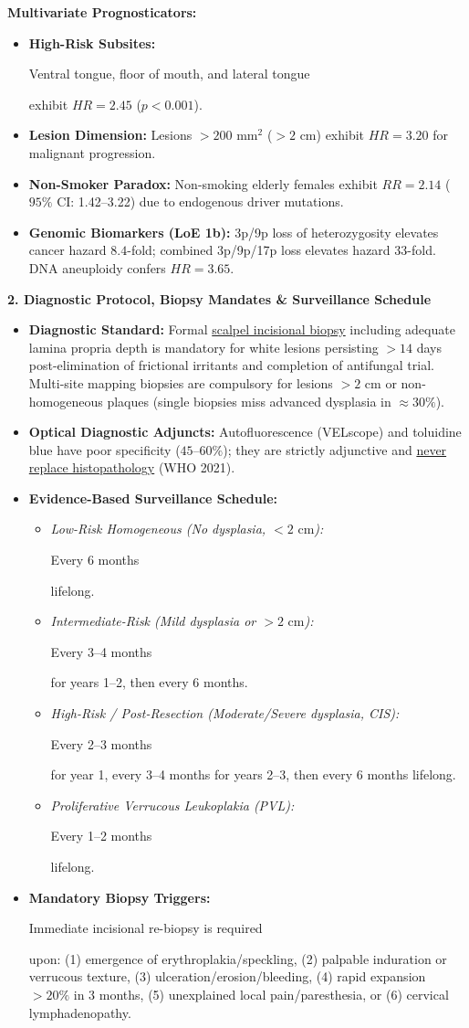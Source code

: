 \documentclass[9pt,a4paper]{article}
\newcommand{\hlg}[1]{\colorbox{hlgray}{\strut #1}}
\newcommand{\hly}[1]{\colorbox{hlyellow}{\strut #1}}
\newcommand{\hlr}[1]{\colorbox{hlred}{\strut\color{darkred}#1}}
\begin{document}
\vspace{-2pt}
\textbf{Multivariate Prognosticators:}
\begin{itemize}
    \item \textbf{High-Risk Subsites:} \hly{Ventral tongue, floor of mouth, and lateral tongue} exhibit $HR = 2.45$ ($p<0.001$).
    \item \textbf{Lesion Dimension:} Lesions $>200\text{ mm}^2$ ($>2\text{ cm}$) exhibit $HR = 3.20$ for malignant progression.
    \item \textbf{Non-Smoker Paradox:} Non-smoking elderly females exhibit $RR = 2.14$ ($95\%$ CI: 1.42--3.22) due to endogenous driver mutations.
    \item \textbf{Genomic Biomarkers (LoE 1b):} 3p/9p loss of heterozygosity elevates cancer hazard $8.4$-fold; combined 3p/9p/17p loss elevates hazard $33$-fold. DNA aneuploidy confers $HR = 3.65$.
\end{itemize}

\vspace{2pt}
{\large\bfseries 2. Diagnostic Protocol, Biopsy Mandates \& Surveillance Schedule}
\vspace{1pt}

\begin{itemize}
    \item \textbf{Diagnostic Standard:} Formal \underline{scalpel incisional biopsy} including adequate lamina propria depth is mandatory for white lesions persisting $>14$ days post-elimination of frictional irritants and completion of antifungal trial. Multi-site mapping biopsies are compulsory for lesions $>2\text{ cm}$ or non-homogeneous plaques (single biopsies miss advanced dysplasia in $\approx 30\%$).
    \item \textbf{Optical Diagnostic Adjuncts:} Autofluorescence (VELscope) and toluidine blue have poor specificity ($45\text{--}60\%$); they are strictly adjunctive and \underline{never replace histopathology} (WHO 2021).
    \item \textbf{Evidence-Based Surveillance Schedule:}
    \begin{itemize}
        \item \textit{Low-Risk Homogeneous (No dysplasia, $<2\text{ cm}$):} \hlg{Every 6 months} lifelong.
        \item \textit{Intermediate-Risk (Mild dysplasia or $>2\text{ cm}$):} \hlg{Every 3--4 months} for years 1--2, then every 6 months.
        \item \textit{High-Risk / Post-Resection (Moderate/Severe dysplasia, CIS):} \hlg{Every 2--3 months} for year 1, every 3--4 months for years 2--3, then every 6 months lifelong.
        \item \textit{Proliferative Verrucous Leukoplakia (PVL):} \hlr{Every 1--2 months} lifelong.
    \end{itemize}
    \item \textbf{Mandatory Biopsy Triggers:} \hly{Immediate incisional re-biopsy is required} upon: (1) emergence of erythroplakia/speckling, (2) palpable induration or verrucous texture, (3) ulceration/erosion/bleeding, (4) rapid expansion $>20\%$ in 3 months, (5) unexplained local pain/paresthesia, or (6) cervical lymphadenopathy.
\end{itemize}
\end{document}
